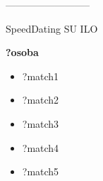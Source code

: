 

\begin{minipage}[l]{\textwidth}
--------------------------

  \footnotesize{SpeedDating SU ILO}

  \bfseries{?osoba}

  \begin{itemize}
    \item ?match1
    \item ?match2
    \item ?match3
    \item ?match4
    \item ?match5
    \end{itemize}



\end{minipage}
